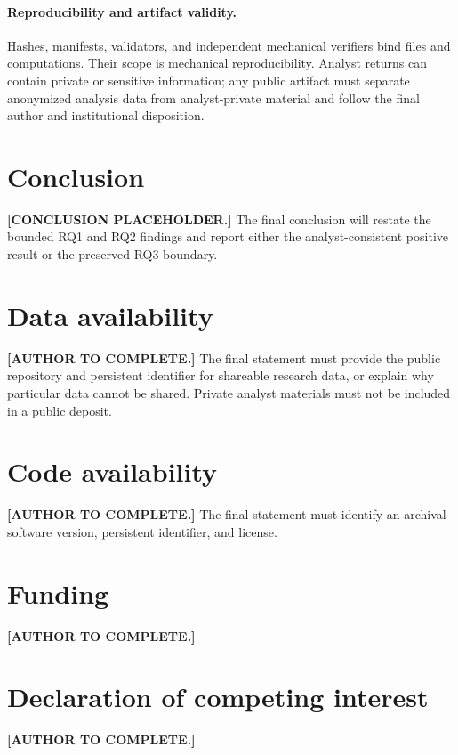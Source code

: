 \documentclass[preprint,review,12pt,authoryear]{elsarticle}
\begin{document}
\paragraph{Reproducibility and artifact validity.}
Hashes, manifests, validators, and independent mechanical verifiers bind files
and computations. Their scope is mechanical reproducibility. Analyst returns
can contain private or sensitive information; any public artifact must separate
anonymized analysis data from analyst-private material and follow the final
author and institutional disposition.

\section{Conclusion}
\label{sec:conclusion}

\textbf{[CONCLUSION PLACEHOLDER.]}
The final conclusion will restate the bounded RQ1 and RQ2 findings and report
either the analyst-consistent positive result or the preserved RQ3 boundary.

\section*{Data availability}

\textbf{[AUTHOR TO COMPLETE.]}
The final statement must provide the public repository and persistent
identifier for shareable research data, or explain why particular data cannot
be shared. Private analyst materials must not be included in a public deposit.

\section*{Code availability}

\textbf{[AUTHOR TO COMPLETE.]}
The final statement must identify an archival software version, persistent
identifier, and license.

\section*{Funding}

\textbf{[AUTHOR TO COMPLETE.]}

\section*{Declaration of competing interest}

\textbf{[AUTHOR TO COMPLETE.]}
\end{document}

